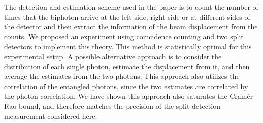 The detection and estimation scheme used in the paper is to count the number of times that the biphoton arrive at the left side, right side or at different sides of the detector and then extract the information of the beam displacement from the counts. We proposed an experiment using coincidence counting and two split detectors to implement this theory. This method is statistically optimal for this experimental setup.  A possible alternative approach is to consider the distribution of each single photon, estimate the displacement from it, and then average the estimates from the two photons. This approach also utilizes the correlation of the entangled photons, since the two estimates are correlated by the photon correlation.  We have shown this approach also saturates the Cram\'{e}r-Rao bound, and therefore matches the precision of the split-detection measurement considered here.



